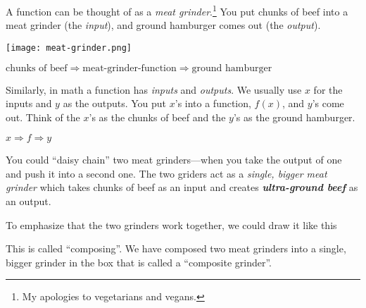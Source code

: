 \documentclass[fleqn,letterpaper,12pt,printwatermark=false]{memoir}
\begin{document}
\begin{myLesson}
    A function can be thought of as a \emph{meat grinder}.\footnote{
        My apologies to vegetarians and vegans.
    }
    You put chunks of beef into a meat grinder (the \emph{input}),
    and ground hamburger comes out (the \emph{output}). 

    \begin{center}
    \texttt{[image: meat-grinder.png]} 
    \end{center}

    \begin{center}
    \(
        \text{chunks of beef}
        \Longrightarrow
        \text{meat-grinder-function}
        \Longrightarrow
        \text{ground hamburger}
    \)
    \end{center}

    Similarly,
    in math a function has \emph{inputs} and \emph{outputs}.
    We usually use $x$ for the inputs and $y$ as the outputs.
    You put $x$'s into a function, $f(x)$,
    and $y$'s come out.
    Think of the $x$'s as the chunks of beef
    and the $y$'s as the ground hamburger.
    \begin{center}
    \(
        x
        \Longrightarrow
        f
        \Longrightarrow
        y
    \)
    \end{center}

    You could ``daisy chain'' two meat grinders---when 
    you take the output of one and push it into
    a second one.
    The two griders act as a  
    \emph{single, bigger meat grinder} which takes chunks of beef
    as an input and creates 
    {\bfseries\itshape ultra-ground beef} as an output.

    \begin{center}
    \end{center}
    To emphasize that the two grinders work together, 
    we could draw it like this 
    \begin{center}
    \end{center}
    This is called ``composing''. 
    We have composed two meat grinders
    into a single, bigger grinder in the box that is called 
    a ``composite grinder''.


\end{myLesson}
\end{document}
